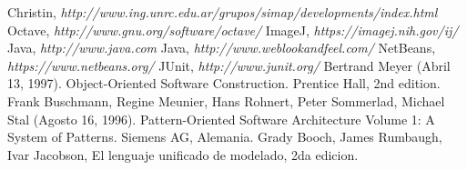\begin{thebibliography}{1}
 Christin, \emph{http://www.ing.unrc.edu.ar/grupos/simap/developments/index.html}
 Octave, \emph{http://www.gnu.org/software/octave/}
 ImageJ, \emph{https://imagej.nih.gov/ij/}
 Java, \emph{http://www.java.com}
 Java, \emph{http://www.weblookandfeel.com/}
 NetBeans, \emph{https://www.netbeans.org/}
 JUnit, \emph{http://www.junit.org/}
 Bertrand Meyer (Abril 13, 1997). Object-Oriented Software Construction. Prentice Hall, 2nd edition.
 Frank Buschmann, Regine Meunier, Hans Rohnert, Peter Sommerlad, Michael Stal (Agosto 16, 1996). Pattern-Oriented Software Architecture Volume 1: A System of Patterns.  Siemens AG, Alemania.
 Grady Booch, James Rumbaugh, Ivar Jacobson, El lenguaje unificado de modelado, 2da edicion.
\end{thebibliography}